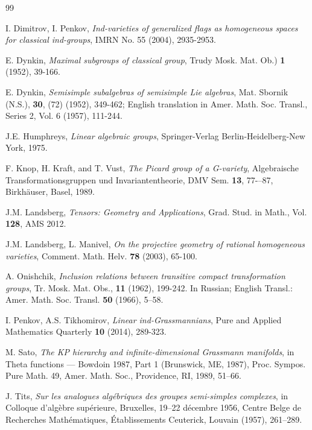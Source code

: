 \documentclass[12pt]{amsart}
\begin{document}
\begin{thebibliography}{99}

 I. Dimitrov, I. Penkov, {\it Ind-varieties of generalized flags as homogeneous spaces for classical ind-groups}, IMRN No. 55 (2004), 2935-2953.

 E. Dynkin, {\it Maximal subgroups of classical group}, Trudy Mosk. Mat. Ob.) {\bf 1} (1952), 39-166.

 E. Dynkin, {\it Semisimple subalgebras of semisimple Lie algebras}, Mat. Sbornik (N.S.), {\bf 30}, (72) (1952), 349-462; English translation in Amer. Math. Soc. Transl., Series 2, Vol. 6 (1957), 111-244.

 J.E. Humphreys, {\it Linear algebraic groups}, Springer-Verlag Berlin-Heidelberg-New York, 1975.  

 F. Knop, H. Kraft, and T. Vust, {\it The Picard group of a G-variety}, Algebraische Transformationsgruppen und Invariantentheorie, DMV Sem. {\bf 13}, 77-–87, Birkh\"auser, Basel, 1989.

 J.M. Landsberg, {\it Tensors: Geometry and Applications}, Grad. Stud. in Math., Vol. {\bf 128}, AMS 2012.

 J.M. Landsberg, L. Manivel, {\it On the projective geometry of rational homogeneous varieties}, Comment. Math. Helv. {\bf 78} (2003), 65-100.

 A. Onishchik, {\it Inclusion relations between transitive compact transformation groups}, Tr. Mosk. Mat. Obs., {\bf 11} (1962), 199-242. In Russian; English Transl.: Amer. Math. Soc. Transl. {\bf 50} (1966), 5–58.

 I. Penkov, A.S. Tikhomirov, {\it Linear ind-Grassmannians}, Pure and Applied Mathematics Quarterly {\bf 10} (2014), 289-323.

 M. Sato, {\it The KP hierarchy and infinite-dimensional Grassmann manifolds}, in Theta functions — Bowdoin 1987, Part 1 (Brunswick, ME, 1987), Proc. Sympos. Pure Math. 49, Amer. Math. Soc., Providence, RI, 1989, 51–66.

 J. Tits, {\it Sur les analogues alg{\'e}briques des groupes semi-simples complexes}, in Colloque d’alg{\`e}bre sup{\'e}rieure, Bruxelles, 19–22 d{\'e}cembre 1956, Centre Belge de Recherches Math{\'e}matiques, {\'E}tablissements Ceuterick, Louvain (1957), 261–289.


\end{thebibliography}
\end{document}
